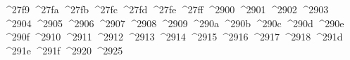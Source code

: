 {  ^^^^27f9%
  ^^^^27fa%
  ^^^^27fb%
  ^^^^27fc%
  ^^^^27fd%
  ^^^^27fe%
  ^^^^27ff%
  ^^^^2900%
  ^^^^2901%
  ^^^^2902%
  ^^^^2903%
  ^^^^2904%
  ^^^^2905%
  ^^^^2906%
  ^^^^2907%
  ^^^^2908%
  ^^^^2909%
  ^^^^290a%
  ^^^^290b%
  ^^^^290c%
  ^^^^290d%
  ^^^^290e%
  ^^^^290f%
  ^^^^2910%
  ^^^^2911%
  ^^^^2912%
  ^^^^2913%
  ^^^^2914%
  ^^^^2915%
  ^^^^2916%
  ^^^^2917%
  ^^^^2918%
  ^^^^291d%
  ^^^^291e%
  ^^^^291f%
  ^^^^2920%
  ^^^^2925%
}
